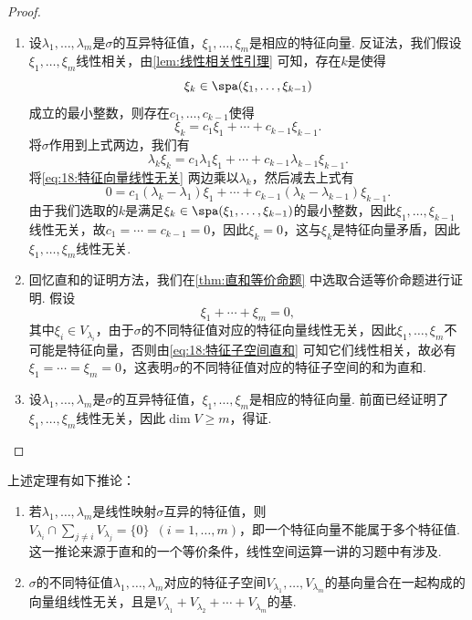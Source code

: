 \begin{proof}
    \begin{enumerate}
        \item 设$\lambda_1,\ldots,\lambda_m$是$\sigma$的互异特征值，$\xi_1,\ldots,\xi_m$是相应的特征向量. 反证法，我们假设$\xi_1,\ldots,\xi_m$线性相关，由\autoref{lem:线性相关性引理} 可知，存在$k$是使得
              \[\xi_k\in\spa(\xi_1,\ldots,\xi_{k-1})\]
              成立的最小整数，则存在$c_1,\ldots,c_{k-1}$使得
              \begin{equation}\label{eq:18:特征向量线性无关}
                  \xi_k=c_1\xi_1+\cdots+c_{k-1}\xi_{k-1}.
              \end{equation}
              将$\sigma$作用到上式两边，我们有
              \[\lambda_k\xi_k=c_1\lambda_1\xi_1+\cdots+c_{k-1}\lambda_{k-1}\xi_{k-1}.\]
              将\autoref{eq:18:特征向量线性无关} 两边乘以$\lambda_k$，然后减去上式有
              \[0=c_1(\lambda_k-\lambda_1)\xi_1+\cdots+c_{k-1}(\lambda_k-\lambda_{k-1})\xi_{k-1}.\]
              由于我们选取的$k$是满足$\xi_k\in\spa(\xi_1,\ldots,\xi_{k-1})$的最小整数，因此$\xi_1,\ldots,\xi_{k-1}$线性无关，故$c_1=\cdots=c_{k-1}=0$，因此$\xi_k=0$，这与$\xi_k$是特征向量矛盾，因此$\xi_1,\ldots,\xi_m$线性无关.

        \item 回忆直和的证明方法，我们在\autoref{thm:直和等价命题} 中选取合适等价命题进行证明. 假设
              \begin{equation}\label{eq:18:特征子空间直和}
                  \xi_1+\cdots+\xi_m=0,
              \end{equation}
              其中$\xi_i\in V_{\lambda_i}$，由于$\sigma$的不同特征值对应的特征向量线性无关，因此$\xi_1,\ldots,\xi_m$不可能是特征向量，否则由\autoref{eq:18:特征子空间直和} 可知它们线性相关，故必有$\xi_1=\cdots=\xi_m=0$，这表明$\sigma$的不同特征值对应的特征子空间的和为直和.

        \item 设$\lambda_1,\ldots,\lambda_m$是$\sigma$的互异特征值，$\xi_1,\ldots,\xi_m$是相应的特征向量. 前面已经证明了$\xi_1,\ldots,\xi_m$线性无关，因此$\dim V\geqslant m$，得证.
    \end{enumerate}
\end{proof}

上述定理有如下推论：
\begin{enumerate}
    \item 若$\lambda_1,\ldots,\lambda_m$是线性映射$\sigma$互异的特征值，则$V_{\lambda_i}\cap\sum\limits_{j\neq i}V_{\lambda_j}=\{0\}
              \enspace(i=1,\ldots,m)$，即一个特征向量不能属于多个特征值. 这一推论来源于直和的一个等价条件，线性空间运算一讲的习题中有涉及.

    \item $\sigma$的不同特征值$\lambda_1,\ldots,\lambda_m$对应的特征子空间$V_{\lambda_1},\ldots,V_{\lambda_m}$的基向量合在一起构成的向量组线性无关，且是$V_{\lambda_1}+V_{\lambda_2}+\cdots+V_{\lambda_m}$的基.
\end{enumerate}


